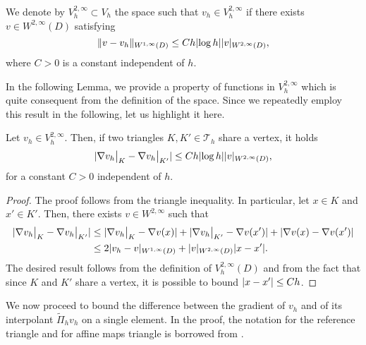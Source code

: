 \documentclass[10pt]{article}
\begin{document}
\begin{definition}\label{def:Vh2Inf} We denote by $V_h^{2, \infty} \subset V_h$ the space such that $v_h \in V_h^{2, \infty}$ if there exists $v \in W^{2, \infty}(D)$ satisfying
	\begin{equation}
		\lVert v - v_h\rVert_{W^{1, \infty}(D)} \leq C h \lvert\log h\rvert \lvert v\rvert_{W^{2, \infty}(D)},
	\end{equation} 
	where $C > 0$ is a constant independent of $h$.
\end{definition}

In the following Lemma, we provide a property of functions in $V_h^{2, \infty}$ which is quite consequent from the definition of the space. Since we repeatedly employ this result in the following, let us highlight it here.
\begin{lemma}\label{lem:Vh2InfPropr} Let $v_h \in V_h^{2, \infty}$. Then, if two triangles $K, K' \in \mathcal T_h$ share a vertex, it holds
	\begin{equation}
		\lvert\nabla v_h \bigr\rvert_{K} - \nabla v_h \bigr\rvert_{K'}\rvert \leq Ch \lvert\log h\rvert \lvert v\rvert_{W^{2, \infty}(D)},
	\end{equation} 
	for a constant $C > 0$ independent of $h$.
\end{lemma}
\begin{proof} The proof follows from the triangle inequality. In particular, let $x \in K$ and $x' \in K'$. Then, there exists $v \in W^{2, \infty}$ such that
	\begin{equation}
	\begin{aligned}
		\lvert\nabla v_h \bigr\rvert_{K} - \nabla v_h \bigr\rvert_{K'}\rvert &\leq \lvert\nabla v_h \bigr\rvert_{K} - \nabla v(x)\rvert + \lvert\nabla v_h \bigr\rvert_{K'} - \nabla v (x')\rvert + \lvert\nabla v (x) - \nabla v (x')\rvert\\
		&\leq 2 \lvert v_h - v\rvert_{W^{1, \infty}(D)} + \lvert v\rvert_{W^{2, \infty}(D)}\lvert x - x'\rvert.
	\end{aligned}
	\end{equation}
	The desired result follows from the definition of $V_h^{2, \infty}(D)$ and from the fact that since $K$ and $K'$ share a vertex, it is possible to bound $\lvert x - x'\rvert \leq Ch$.
\end{proof}

We now proceed to bound the difference between the gradient of $v_h$ and of its interpolant $\widetilde \Pi_h v_h$ on a single element. In the proof, the notation for the reference triangle and for affine maps triangle is borrowed from \cite[Chapter 4]{Qua09}.
\end{document}
